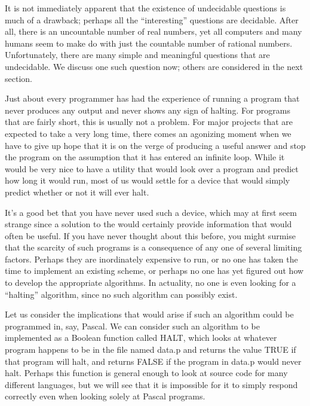 It is not immediately apparent that the existence of undecidable questions is
much of a drawback; perhaps all the ``interesting'' questions are decidable.
After all, there is an uncountable number of real numbers, yet all computers
and many humans seem to make do with just the countable number of rational
numbers. Unfortunately, there are many simple and meaningful questions that are
undecidable. We discuss one such question now; others are considered in the next
section.

Just about every programmer has had the experience of running a program that
never produces any output and never shows any sign of halting. For programs
that are fairly short, this is usually not a problem. For major projects that
are expected to take a very long time, there comes an agonizing moment when we
have to give up hope that it is on the verge of producing a useful answer and
stop the program on the assumption that it has entered an infinite loop. While
it would be very nice to have a utility that would look over a program and
predict how long it would run, most of us would settle for a device that would
simply predict whether or not it will ever halt.

It's a good bet that you have never used such a device, which may at first seem
strange since a solution to the \emph{} would certainly provide
information that would often be useful. If you have never thought about this
before, you might surmise that the scarcity of such programs is a consequence of
any one of several limiting factors. Perhaps they are inordinately expensive to
run, or no one has taken the time to implement an existing scheme, or perhaps no
one has yet figured out how to develop the appropriate algorithms. In actuality,
no one is even looking for a ``halting'' algorithm, since no such algorithm can
possibly exist.

Let us consider the implications that would arise if such an algorithm could be
programmed in, say, Pascal. We can consider such an algorithm to be implemented
as a Boolean function called HALT, which looks at whatever program happens to
be in the file named data.p and returns the value TRUE if that program will
halt, and returns FALSE if the program in data.p would never halt. Perhaps this
function is general enough to look at source code for many different languages,
but we will see that it is impossible for it to simply respond correctly even
when looking solely at Pascal programs.

